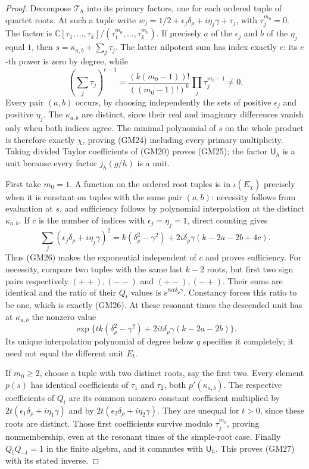 \documentclass[11pt]{article}
\theoremstyle{remark}\newtheorem{remark}[theorem]{Remark}
\begin{document}
\begin{proof}
Decompose $\mathcal T_h$ into its primary factors, one for each ordered
tuple of quartet roots.  At such a tuple write
$w_j=1/2+\epsilon_j\delta_\rho+i\eta_j\gamma+\tau_j$,
with $\tau_j^{m_0}=0$.  The factor is
$\mathbb C[\tau_1,\ldots,\tau_k]/(\tau_1^{m_0},\ldots,\tau_k^{m_0})$.
If precisely $a$ of the $\epsilon_j$ and $b$ of the $\eta_j$ equal
$1$, then $s=\kappa_{a,b}+\sum_j\tau_j$.  The latter nilpotent sum
has index exactly $e$: its $e$-th power is zero by degree, while
\[
 (\textstyle\sum_j\tau_j)^{e-1}
 =\frac{(k(m_0-1))!}{((m_0-1)!)^k}\prod_j\tau_j^{m_0-1}\ne0.
\]
Every pair $(a,b)$ occurs, by choosing independently the sets of
positive $\epsilon_j$ and positive $\eta_j$.  The $\kappa_{a,b}$
are distinct, since their real and imaginary differences vanish only
when both indices agree.  The minimal polynomial of $s$ on the
whole product is therefore exactly $\chi$, proving (GM24) including
every primary multiplicity.  Taking divided Taylor coefficients
of (GM20) proves (GM25); the factor $\mathsf U_h$ is a unit because
every factor $j_h(g/h)$ is a unit.

First take $m_0=1$.  A function on the ordered root tuples is in
$\iota(E_\chi)$ precisely when it is constant on tuples with the
same pair $(a,b)$: necessity follows from evaluation at $s$, and
sufficiency follows by polynomial interpolation at the distinct
$\kappa_{a,b}$.  If $c$ is the number of indices with
$\epsilon_j=\eta_j=1$, direct counting gives
\[
 \sum_j(\epsilon_j\delta_\rho+i\eta_j\gamma)^2
 =k(\delta_\rho^2-\gamma^2)
        +2i\delta_\rho\gamma(k-2a-2b+4c).
\]
Thus (GM26) makes the exponential independent of $c$ and proves
sufficiency.  For necessity, compare two tuples with the same last
$k-2$ roots, but first two sign pairs respectively $(++),(--)$
and $(+-),(-+)$.  Their sums are identical and the ratio of their
$Q_t$ values is $e^{8it\delta_\rho\gamma}$.  Constancy forces this
ratio to be one, which is exactly (GM26).  At these resonant times
the descended unit has at $\kappa_{a,b}$ the nonzero value
\[
 \exp\{tk(\delta_\rho^2-\gamma^2)
              +2it\delta_\rho\gamma(k-2a-2b)\}.
\]
Its unique interpolation polynomial of degree below $q$ specifies it
completely; it need not equal the different unit $E_t$.

If $m_0\geq2$, choose a tuple with two distinct roots, say the first
two.  Every element $p(s)$ has identical coefficients of $\tau_1$
and $\tau_2$, both $p'(\kappa_{a,b})$.  The respective coefficients
of $Q_t$ are its common nonzero constant coefficient multiplied by
$2t(\epsilon_1\delta_\rho+i\eta_1\gamma)$ and by
$2t(\epsilon_2\delta_\rho+i\eta_2\gamma)$.  They are unequal for
$t>0$, since these roots are distinct.  Those first coefficients
survive modulo $\tau_j^{m_0}$, proving nonmembership, even at the
resonant times of the simple-root case.  Finally $Q_tQ_{-t}=1$
in the finite algebra, and it commutes with $\mathsf U_h$.
This proves (GM27) with its stated inverse.
\end{proof}
\end{document}
